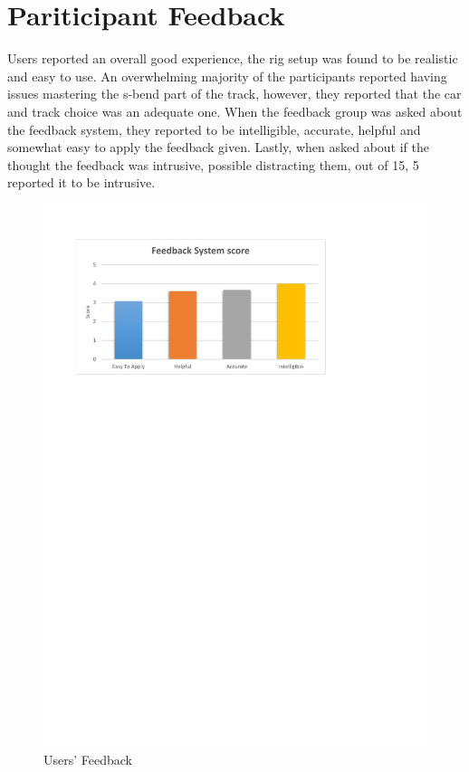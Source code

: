 \section{Pariticipant Feedback}
\label{sec:eval-usersFeedback}
Users reported an overall good experience, the rig setup was found to be realistic and easy to use. An overwhelming majority of the participants reported having issues mastering the s-bend part of the track, however, they reported that the car and track choice was an adequate one. When the feedback group was asked about the feedback system, they reported to be intelligible, accurate, helpful and somewhat easy to apply the feedback given. Lastly, when asked about if the thought the feedback was intrusive, possible distracting them, out of 15, 5 reported it to be intrusive.

\begin{figure}[!htb]
	\centering
	\includegraphics[width=\textwidth]{charts/feedbacksystemfeedback.pdf}
	\caption[feedback system feedback]{Users' Feedback}
	\label{fig:chart-feedbacksystemfeedback}
\end{figure}

